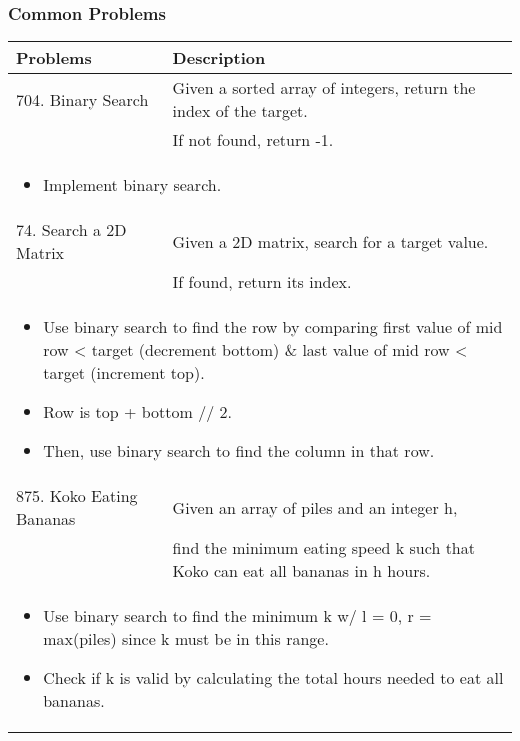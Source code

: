 \subsubsection{Common Problems}
\begin{summary}
    \begin{center}
        \begin{tabular}{ll}
            \toprule
            \textbf{Problems} & \textbf{Description} \\
            \midrule
            704. Binary Search & Given a sorted array of integers, return the index of the target. \\
            & If not found, return -1. \\
            \multicolumn{2}{p{\linewidth}}{
                \begin{itemize}
                    \item Implement binary search.
                \end{itemize}
            } \\
            \midrule
            74. Search a 2D Matrix & Given a 2D matrix, search for a target value. \\
            & If found, return its index. \\
            \multicolumn{2}{p{\linewidth}}{
                \begin{itemize}
                    \item Use binary search to find the row by comparing first value of mid row < target (decrement bottom) \& last value of mid row < target (increment top).
                    \item Row is top + bottom // 2.
                    \item Then, use binary search to find the column in that row.
                \end{itemize}
            } \\
            \midrule
            875. Koko Eating Bananas & Given an array of piles and an integer h, \\
            & find the minimum eating speed k such that Koko can eat all bananas in h hours. \\
            \multicolumn{2}{p{\linewidth}}{
                \begin{itemize}
                    \item Use binary search to find the minimum k w/ l = 0, r = max(piles) since k must be in this range.
                    \item Check if k is valid by calculating the total hours needed to eat all bananas.

\end{itemize}}
\end{tabular}
\end{center}
\end{summary}
